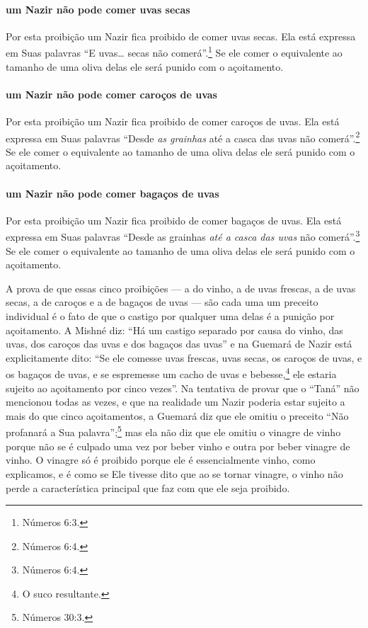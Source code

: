 \paragraph{um Nazir não pode comer uvas secas}

Por esta proibição um Nazir fica proibido de comer uvas secas. Ela está
expressa em Suas palavras ``E uvas\ldots{} secas não comerá''.\footnote{Números 6:3.}
Se ele comer o equivalente ao tamanho de uma oliva delas ele será punido
com o açoitamento.

\paragraph{um Nazir não pode comer caroços de uvas}

Por esta proibição um Nazir fica proibido de comer caroços de uvas. Ela
está expressa em Suas palavras ``Desde \emph{as grainhas} até a casca
das uvas não comerá''.\footnote{Números 6:4.} Se ele comer o equivalente ao
tamanho de uma oliva delas ele será punido com o açoitamento.

\paragraph{um Nazir não pode comer bagaços de uvas}

Por esta proibição um Nazir fica proibido de comer bagaços de uvas. Ela
está expressa em Suas palavras ``Desde as grainhas \emph{até a casca das
uvas} não comerá''.\footnote{Números 6:4.} Se ele comer o equivalente ao tamanho
de uma oliva delas ele será punido com o açoitamento.

A prova de que essas cinco proibições --- a do vinho, a de uvas
frescas, a de uvas secas, a de caroços e a de bagaços de uvas --- são
cada uma um preceito individual é o fato de que o castigo por qualquer uma delas é a
punição por açoitamento. A Mishné diz: ``Há um castigo separado por
causa do vinho, das uvas, dos caroços das uvas e dos bagaços das uvas''
e na Guemará de Nazir está explicitamente dito: ``Se ele comesse uvas
frescas, uvas secas, os caroços de uvas, e os bagaços de uvas, e se
espremesse um cacho de uvas e bebesse,\footnote{O suco resultante.} ele estaria
sujeito ao açoitamento por cinco vezes''. Na tentativa de provar que o
``Taná'' não mencionou todas as vezes, e que na realidade um Nazir
poderia estar sujeito a mais do que cinco açoitamentos, a Guemará diz
que ele omitiu o preceito ``Não profanará a Sua palavra'';\footnote{Números
30:3.} mas ela não diz que ele omitiu o vinagre de vinho porque não se é
culpado uma vez por beber vinho e outra por beber vinagre de vinho. O
vinagre só é proibido porque ele é essencialmente vinho, como
explicamos, e é como se Ele tivesse dito que ao se tornar vinagre, o
vinho não perde a característica principal que faz com que ele seja
proibido.

